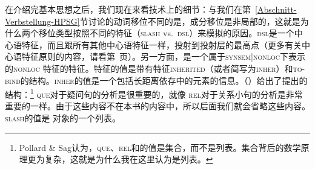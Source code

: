 在介绍完基本思想之后，我们现在来看技术上的细节：与我们在第~\ref{Abschnitt-Verbstellung-HPSG}节讨论的动词移位不同的是，成分移位是非局部的，这就是为什么两个移位类型按照不同的特征（\textsc{slash} vs.\ \textsc{dsl}）来模拟的原因。\textsc{dsl}是一个中心语特征，而且跟所有其他中心语特征一样，投射到投射层的最高点（更多有关中心语特征原则的内容，请看第~\pageref{prinzip-hfp}页）。另一方面，\slasch 是一个属于\textsc{synsem|nonloc}下表示的\textsc{nonloc} 特征的特征。\nonloc 特征的值是带有特征\textsc{inherited}（或者简写为\textsc{inher}）和\textsc{to-bind}的结构。\textsc{inher}的值是一个包括长距离依存中的元素的信息。（）给出了\citet[]{ps2}提出的结构：\footnote{
Pollard \& Sag认为，\textsc{que}、\textsc{rel}和\slasch 的值是集合，而不是列表。集合背后的数学原理更为复杂，这就是为什么我在这里认为是列表。
}
\ea
{}
\z
\textsc{que}对于疑问句的分析是很重要的，就像 \textsc{rel}对于关系小句的分析是非常重要的一样。由于这些内容不在本书的内容中，所以后面我们就会省略这些内容。\textsc{slash}的值是 对象的一个列表。

